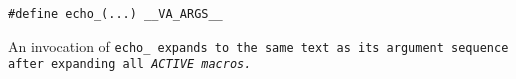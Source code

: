 
\tt{#define echo_(...) __VA_ARGS__}


An invocation of \tt{echo_} expands to the same text as its
argument sequence after expanding all \it{\tt{ACTIVE}} macros.
